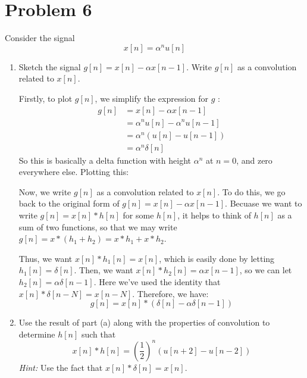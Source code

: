 \documentclass[10pt]{article}
\begin{document}
	\section*{Problem 6}
	Consider the signal 
	\[
		x[n] = \alpha ^{n}u[n]
	\] 
	\begin{enumerate}[label=\alph*)]
		\item Sketch the signal \( g[n] = x[n] - \alpha x[n -1] \). Write \( g[n] \) as a convolution related 
			to \( x[n] \). 

			\begin{solution}
				Firstly, to plot \( g[n] \), we simplify the expression for \( g \) :
				\begin{align*}
					g[n] &= x[n] - \alpha x[n -1] \\
						 &= \alpha ^{n} u[n] - \alpha ^{n}u[n-1]\\
						 &= \alpha ^{n}(u[n] - u[n -1] )\\
						 &= \alpha ^{n} \delta[n] 
				\end{align*}
				So this is basically a delta function with height \( \alpha ^{n} \) at \( n = 0 \), and zero 
				everywhere else. Plotting this: 
				\begin{center}
				\end{center}
				Now, we write \( g[n] \) as a convolution related to \( x[n] \). To do this, we go back to the original 
				form of \( g[n] = x[n] - \alpha x[n - 1] \). Becuase we want to write \( g[n] = x[n] * h[n] \) for 
				some \( h[n] \), it helps to think of \( h[n] \) as a sum of two functions, so that we may 
				write \( g[n] = x*(h_1 + h_2) = x*h_1 + x*h_2 \). 
				
				Thus, we want \( x[n]*h_1[n] =x[n] \), which is easily done by letting \( h_1[n] = \delta[n] \). Then, 
				we want \( x[n] * h_2[n] = \alpha x[n-1] \), so we can let \( h_2[n] = \alpha \delta[n - 1] \). 
				Here we've used the identity that \( x[n] * \delta[n - N] = x[n - N] \). Therefore, 
				we have:
				\[
					g[n] = x[n] * (\delta[n] - \alpha \delta[n - 1])
				\] 
			\end{solution}
		\item Use the result of part (a) along with the properties of convolution to determine \( h[n] \) 
			such that 
			\[
				x[n] * h[n] = \left( \frac{1}{2}\right)^{n}(u[n + 2] - u[n-2])
			\] 
			\textit{Hint:} Use the fact that \( x[n] * \delta[n] = x[n] \). 


\end{enumerate}
\end{document}
